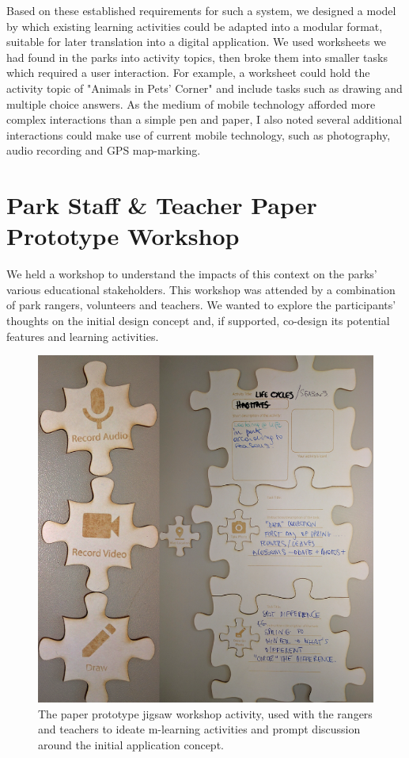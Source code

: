 Based on these established requirements for such a system, we designed a model by which existing learning activities could be adapted into a modular format, suitable for later translation into a digital application. We used worksheets we had found in the parks into activity topics, then broke them into smaller tasks which required a user interaction. For example, a worksheet could hold the activity topic of "Animals in Pets' Corner" and include tasks such as drawing and multiple choice answers. As the medium of mobile technology afforded more complex interactions than a simple pen and paper, I also noted several additional interactions could make use of current mobile technology, such as photography, audio recording and GPS map-marking.

\section{Park Staff \& Teacher Paper Prototype Workshop}

We held a workshop to understand the impacts of this context on the parks’ various educational stakeholders. This workshop was attended by a combination of park rangers, volunteers and teachers. We wanted to explore the participants’ thoughts on the initial design concept and, if supported, co-design its potential features and learning activities.

\begin{figure}
  \centering
  \includegraphics[width=0.8\columnwidth]{images/chapter04/rangerJigsaw.png}
  \caption{The paper prototype jigsaw workshop activity, used with the rangers and teachers to ideate m-learning activities and prompt discussion around the initial application concept.}
  \label{fig:rangerJigsaw}
\end{figure}

